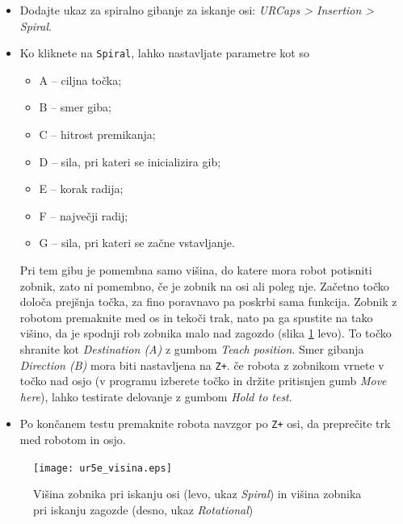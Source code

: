   \begin{mdframed}[backgroundcolor=yellow!20, shadow=true,roundcorner=8pt]
\begin{itemize}
  \item Dodajte ukaz za spiralno gibanje za iskanje osi: \emph{URCaps > Insertion > Spiral}.
  \item Ko kliknete na \verb"Spiral", lahko nastavljate parametre kot so
  \begin{itemize}
        \item A -- ciljna točka;
        \item B -- smer giba;
        \item C -- hitrost premikanja;
        \item D -- sila, pri kateri se inicializira gib;
        \item E -- korak radija;
        \item F -- največji radij;
        \item G -- sila, pri kateri se začne vstavljanje.
  \end{itemize}
  Pri tem gibu je pomembna samo višina, do katere mora robot potisniti zobnik, zato ni pomembno, če je zobnik na osi ali poleg nje. Začetno točko določa prejšnja točka, za fino poravnavo pa poskrbi sama funkcija. Zobnik z robotom premaknite med os in tekoči trak, nato pa ga spustite na tako višino, da je spodnji rob zobnika malo nad zagozdo (slika \ref{fig:ur_visina} levo).
  To točko shranite kot \emph{Destination (A)} z gumbom \emph{Teach position}. Smer gibanja \emph{Direction (B)} mora biti nastavljena na \verb"Z+". če robota z zobnikom vrnete v točko nad osjo (v programu izberete točko in držite pritisnjen gumb \emph{Move here}), lahko testirate delovanje z gumbom \emph{Hold to test}.
  \item Po končanem testu premaknite robota navzgor po \verb"Z+" osi, da preprečite trk med robotom in osjo.
  \end{itemize}
\end{mdframed}

\begin{figure}[!hbt]
\centering
 \texttt{[image: ur5e\_visina.eps]}
\caption{Višina zobnika pri iskanju osi (levo, ukaz \emph{Spiral}) in višina zobnika pri iskanju zagozde (desno, ukaz \emph{Rotational})}
\label{fig:ur_visina}
\end{figure}



